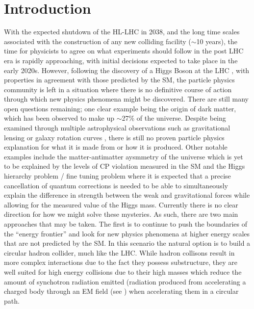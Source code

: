 \chapter{Introduction}

With the expected shutdown of the \ac{HL-LHC} in 2038, and the long time scales associated with the construction of any new colliding facility ($\sim$10 years), the time for physicists to agree on what experiments should follow in the post \ac{LHC} era is rapidly approaching, with initial decisions expected to take place in the early 2020s. However, following the discovery of a Higgs Boson at the \ac{LHC} \cite{:2012gk,Chatrchyan:2012xdj}, with properties in agreement with those predicted by the \ac{SM}, the particle physics community is left in a situation where there is no definitive course of action through which new physics phenomena might be discovered. There are still many open questions remaining; one clear example being the origin of dark matter, which has been observed to make up $\sim$27\% of the universe. Despite being examined through multiple astrophysical observations such as gravitational lensing or galaxy rotation curves \cite{Trimble:1987ee}, there is still no proven particle physics explanation for what it is made from or how it is produced. Other notable examples include the matter-antimatter aysmmetry of the universe which is yet to be explained by the levels of CP violation measured in the \ac{SM} and the Higgs hierarchy problem / fine tuning problem where it is expected that a precise cancellation of quantum corrections is needed to be able to simultaneously explain the difference in strength between the weak and gravitational forces while allowing for the measured value of the Higgs mass. Currently there is no clear direction for how we might solve these mysteries. As such, there are two main approaches that may be taken. The first is to continue to push the boundaries of the ``energy frontier'' and look for new physics phenomena at higher energy scales that are not predicted by the \ac{SM}. In this scenario the natural option is to build a circular hadron collider, much like the \ac{LHC}. While hadron collisons result in more complex interactions due to the fact they possess substructure, they are well suited for high energy collisions due to their high masses which reduce the amount of synchotron radiation emitted (radiation produced from accelerating a charged body through an \ac{EM} field (see ) when accelerating them in a circular path.

